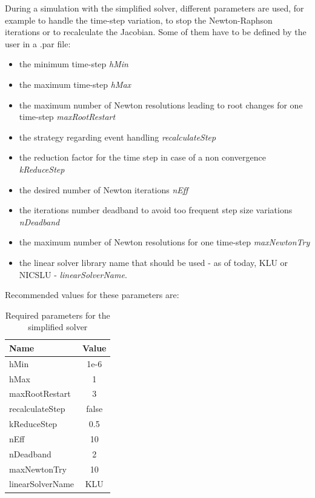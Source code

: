 \documentclass[a4paper, 12pt]{report}
\begin{document}
During a simulation with the simplified solver, different parameters are used, for example to handle the time-step variation, to stop the Newton-Raphson iterations or to recalculate the Jacobian. Some of them have to be defined by the user in a .par file:
\begin{itemize}
\item the minimum time-step \textit{hMin}
\item the maximum time-step \textit{hMax}
\item the maximum number of Newton resolutions leading to root changes for one time-step \textit{maxRootRestart}
\item the strategy regarding event handling \textit{recalculateStep}
\item the reduction factor for the time step in case of a non convergence \textit{kReduceStep}
\item the desired number of Newton iterations \textit{nEff}
\item the iterations number deadband to avoid too frequent step size variations \textit{nDeadband}
\item the maximum number of Newton resolutions for one time-step \textit{maxNewtonTry}
\item the linear solver library name that should be used - as of today, KLU or NICSLU - \textit{linearSolverName}.
\end{itemize}

Recommended values for these parameters are:
\begin{table}[h!]
\center
\begin{tabular}{ l | c }
\toprule
\textbf{{Name}} & \textbf{{Value}} \\
\midrule
hMin & 1e-6 \\
hMax & 1 \\
maxRootRestart & 3 \\
recalculateStep & false \\
kReduceStep & 0.5 \\
nEff & 10 \\
nDeadband & 2 \\
maxNewtonTry & 10 \\
linearSolverName & KLU \\
\bottomrule
\end{tabular}
\caption{Required parameters for the simplified solver}
\end{table}
\end{document}
